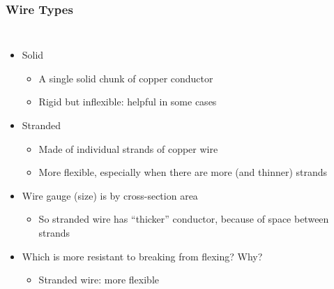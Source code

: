 \documentclass{beamer}
\begin{document}
\begin{frame}
\frametitle{Wire Types}
\begin{columns}[t]
\begin{itemize}
  \item Solid
  \begin{itemize}
    \item A single solid chunk of copper conductor
    \item Rigid but inflexible: helpful in some cases
  \end{itemize}
  \item Stranded
  \begin{itemize}
    \item Made of individual strands of copper wire
    \item More flexible, especially when there are more (and thinner) strands
  \end{itemize}
  \item Wire gauge (size) is by cross-section area
  \begin{itemize}
    \item So stranded wire has ``thicker'' conductor, because of space between strands
  \end{itemize}
  \item Which is more resistant to breaking from flexing? Why?
  \begin{itemize}
    \item<2-> Stranded wire: more flexible %
  \end{itemize}
\end{itemize}


\end{columns}
\end{frame}
\end{document}
